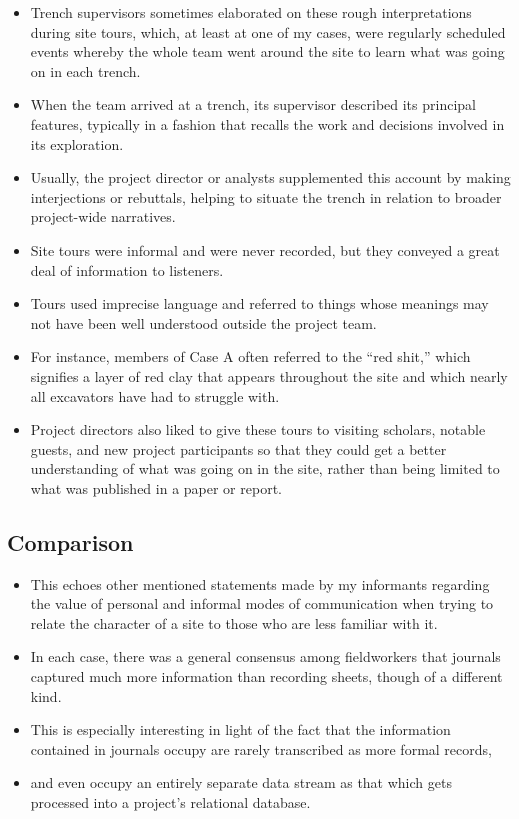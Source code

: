 \documentclass{article}
\begin{document}
\begin{itemize}
  \item Trench supervisors sometimes elaborated on these rough interpretations during site tours, which, at least at one of my cases, were regularly scheduled events whereby the whole team went around the site to learn what was going on in each trench.
  \item When the team arrived at a trench, its supervisor described its principal features, typically in a fashion that recalls the work and decisions involved in its exploration.
  \item Usually, the project director or analysts supplemented this account by making interjections or rebuttals, helping to situate the trench in relation to broader project-wide narratives.
  \item Site tours were informal and were never recorded, but they conveyed a great deal of information to listeners.
  \item Tours used imprecise language and referred to things whose meanings may not have been well understood outside the project team.
  \item For instance, members of Case A often referred to the “red shit,” which signifies a layer of red clay that appears throughout the site and which nearly all excavators have had to struggle with.\\
  
  \item Project directors also liked to give these tours to visiting scholars, notable guests, and new project participants so that they could get a better understanding of what was going on in the site, rather than being limited to what was published in a paper or report.
\end{itemize}

\subsection{Comparison}
\begin{itemize}
  \item This echoes other mentioned statements made by my informants regarding the value of personal and informal modes of communication when trying to relate the character of a site to those who are less familiar with it.

  \item In each case, there was a general consensus among fieldworkers that journals captured much more information than recording sheets, though of a different kind.

  \item This is especially interesting in light of the fact that the information contained in journals occupy are rarely transcribed as more formal records,
  \item and even occupy an entirely separate data stream as that which gets processed into a project's relational database.
\end{itemize}
\end{document}
